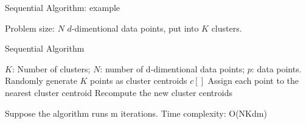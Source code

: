 \documentclass[
nopagebreaks,
style=klope,
fleqn]{powerdot}
\begin{document}
\begin{slide} {Sequential Algorithm: example}
\begin{figure}[h]
  \end{figure}
  \begin{compactitem}
  \item{Problem size: $N$ $d$-dimentional data points, put into $K$ clusters.}
  \end{compactitem}
\end{slide}

\begin{slide} {Sequential Algorithm}
  \begin{algorithmic}[1]
    \INPUT $K$: Number of clusters; $N$: number of d-dimentional data points; $p$: data points. 
    \State Randomly generate $K$ points as cluster centroids $c[]$
    \State Assign each point to the nearest cluster centroid
    \State Recompute the new cluster centroids
    \EndWhile
    \EndFunction
  \end{algorithmic}
  \begin{compactitem}
    \vspace{.5in}
    \item{Suppose the algorithm runs m iterations. Time complexity: O(NKdm)}
  \end{compactitem}
\end{slide}
\end{document}
